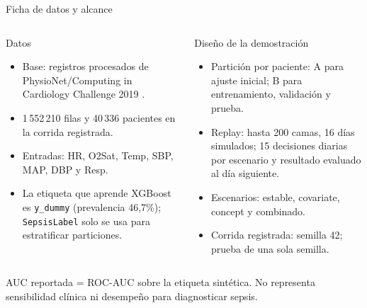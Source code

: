 \documentclass[aspectratio=169,10pt]{beamer}
\begin{document}
\begin{frame}{Ficha de datos y alcance}
\begin{columns}[T]
\begin{block}{Datos}
\begin{itemize}
  \item Base: registros procesados de PhysioNet/Computing in Cardiology
        Challenge 2019 \cite{reyna2020sepsis}.
  \item 1\,552\,210 filas y 40\,336 pacientes en la corrida registrada.
  \item Entradas: HR, O2Sat, Temp, SBP, MAP, DBP y Resp.
  \item La etiqueta que aprende XGBoost es \texttt{y\_dummy}
        (prevalencia 46,7\%); \texttt{SepsisLabel} solo se usa para
        estratificar particiones.
\end{itemize}
\end{block}
\begin{block}{Diseño de la demostración}
\begin{itemize}
  \item Partición por paciente: A para ajuste inicial; B para entrenamiento,
        validación y prueba.
  \item Replay: hasta 200 camas, 16 días simulados; 15 decisiones diarias por
        escenario y resultado evaluado al día siguiente.
  \item Escenarios: estable, covariate, concept y combinado.
  \item Corrida registrada: semilla 42; prueba de una sola semilla.
\end{itemize}
\end{block}
\end{columns}
\vspace{0.2em}
{\footnotesize \textcolor{DARLgray}{AUC reportada = ROC-AUC sobre la etiqueta
sintética. No representa sensibilidad clínica ni desempeño para diagnosticar
sepsis.}}
\end{frame}
\end{document}
